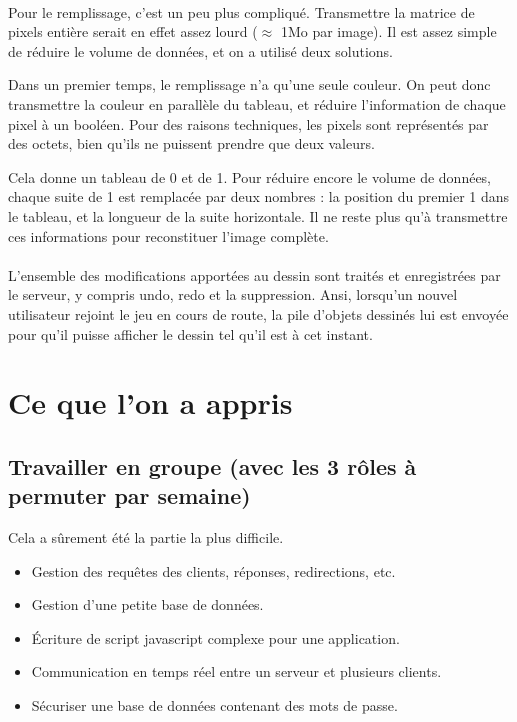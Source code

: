 \documentclass[11pt,a4paper]{article}
\begin{document}
                \paragraph{}
                Pour le remplissage, c'est un peu plus compliqué.
                Transmettre la matrice de pixels entière serait en effet assez lourd ($\approx$ 1Mo par image).
                Il est assez simple de réduire le volume de données, et on a utilisé deux solutions.
                
                Dans un premier temps, le remplissage n'a qu'une seule couleur.
                On peut donc transmettre la couleur en parallèle du tableau,
                et réduire l'information de chaque pixel à un booléen.
                Pour des raisons techniques, les pixels sont représentés par des octets,
                bien qu'ils ne puissent prendre que deux valeurs.

                Cela donne un tableau de 0 et de 1.
                Pour réduire encore le volume de données,
                chaque suite de 1 est remplacée par deux nombres :
                la position du premier 1 dans le tableau, et la longueur de la suite horizontale.
                Il ne reste plus qu'à transmettre ces informations pour reconstituer l'image complète.
                \paragraph{}
                L'ensemble des modifications apportées au dessin sont traités et enregistrées par le serveur,
                y compris undo, redo et la suppression.
                Ansi, lorsqu'un nouvel utilisateur rejoint le jeu en cours de route,
                la pile d'objets dessinés lui est envoyée pour qu'il puisse afficher le dessin tel qu'il est à cet instant.

       

    \section{Ce que l'on a appris}

        \subsection{Travailler en groupe (avec les 3 rôles à permuter par semaine)}
            Cela a sûrement été la partie la plus difficile.
    
        \begin{itemize}        
            \item Gestion des requêtes des clients, réponses, redirections, etc.
            \item Gestion d'une petite base de données.
            \item Écriture de script javascript complexe pour une application.
            \item Communication en temps réel entre un serveur et plusieurs clients.
            \item Sécuriser une base de données contenant des mots de passe.
        \end{itemize}
\end{document}
